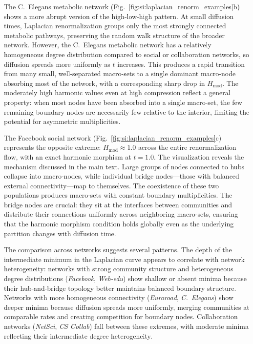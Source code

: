 \documentclass[twocolumn,superscriptaddress,tightenlines,aps,prx,floatfix]{revtex4-2}
\begin{document}
\begin{bibunit}
The C.~Elegans metabolic network (Fig.~\ref{fig:si:laplacian_renorm_examples}b) shows a more abrupt version of the high-low-high pattern. At small diffusion times, Laplacian renormalization groups only the most strongly connected metabolic pathways, preserving the random walk structure of the broader network. However, the C.~Elegans metabolic network has a relatively homogeneous degree distribution compared to social or collaboration networks, so diffusion spreads more uniformly as $t$ increases. This produces a rapid transition from many small, well-separated macro-sets to a single dominant macro-node absorbing most of the network, with a corresponding sharp drop in $H_{\text{mod}}$. The moderately high harmonic values even at high compression reflect a general property: when most nodes have been absorbed into a single macro-set, the few remaining boundary nodes are necessarily few relative to the interior, limiting the potential for asymmetric multiplicities.

The Facebook social network (Fig.~\ref{fig:si:laplacian_renorm_examples}c) represents the opposite extreme: $H_{\text{mod}} \approx 1.0$ across the entire renormalization flow, with an exact harmonic morphism at $t = 1.0$. The visualization reveals the mechanism discussed in the main text. Large groups of nodes connected to hubs collapse into macro-nodes, while individual bridge nodes---those with balanced external connectivity---map to themselves. The coexistence of these two populations produces macro-sets with constant boundary multiplicities. The bridge nodes are crucial: they sit at the interfaces between communities and distribute their connections uniformly across neighboring macro-sets, ensuring that the harmonic morphism condition holds globally even as the underlying partition changes with diffusion time.
 
The comparison across networks suggests several patterns. 
The depth of the intermediate minimum in the Laplacian curve appears to correlate with network heterogeneity: networks with strong community structure and heterogeneous degree distributions (\textit{Facebook}, \textit{Web-edu}) show shallow or absent minima because their hub-and-bridge topology better maintains balanced boundary structure. 
Networks with more homogeneous connectivity (\textit{Euroroad}, \textit{C.~Elegans}) show deeper minima because diffusion spreads more uniformly, merging communities at comparable rates and creating competition for boundary nodes. 
Collaboration networks (\textit{NetSci}, \textit{CS Collab}) fall between these extremes, with moderate minima reflecting their intermediate degree heterogeneity.


\end{bibunit}
\end{document}
